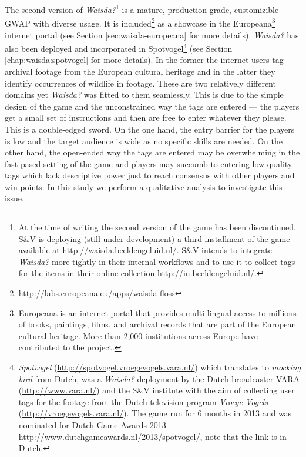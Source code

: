 The second version of \textit{Waisda?}\footnote{At the time of writing the second version of the game has been discontinued. S\&V is deploying (still under development) a third installment of the game available at \url{http://waisda.beeldengeluid.nl/}. S\&V intends to integrate \textit{Waisda?} more tightly in their internal workflows and to use it to collect tags for the items in their online collection \url{http://in.beeldengeluid.nl/}.} is a mature, production-grade, customizible GWAP with diverse usage. 
It is included\footnote{\url{http://labs.europeana.eu/apps/waisda-floss}} as a showcase in the Europeana\footnote{Europeana is an internet portal that provides multi-lingual access to millions of books, paintings, films, and archival records that are part of the European cultural heritage. More than 2,000 institutions across Europe have contributed to the project.} internet portal (see Section \ref{sec:waisda-europeana} for more details). \textit{Waisda?} has also been deployed and incorporated in Spotvogel\footnote{\textit{Spotvogel} (\url{http://spotvogel.vroegevogels.vara.nl/}) which translates to \textit{mocking bird} from Dutch, was a \textit{Waisda?} deployment by the Dutch broadcaster VARA (\url{http://www.vara.nl/}) and the S\&V institute with the aim of collecting user tags for the footage from the Dutch television program \textit{Vroege Vogels} (\url{http://vroegevogels.vara.nl/}). The game run for 6 months in 2013 and was nominated for Dutch Game Awards 2013 \url{http://www.dutchgameawards.nl/2013/spotvogel/}, note that the link is in Dutch.} (see Section \ref{chap:waisda:spotvogel} for more details). In the former the internet users tag archival footage from the European cultural heritage and in the latter they identify occurrences of wildlife in footage. These are two relatively different domains yet \textit{Waisda?} was fitted to them seamlessly. This is due to the simple design of the game and the unconstrained way the tags are entered --- the players get a small set of instructions and then are free to enter whatever they please. This is a double-edged sword. On the one hand, the entry barrier for the players is low and the target audience is wide as no specific skills are needed. On the other hand, the open-ended way the tags are entered may be overwhelming in the fast-pased setting of the game and players may succumb to entering low quality tags which lack descriptive power just to reach consensus with other players and win points. In this study we perform a qualitative analysis to investigate this issue.

